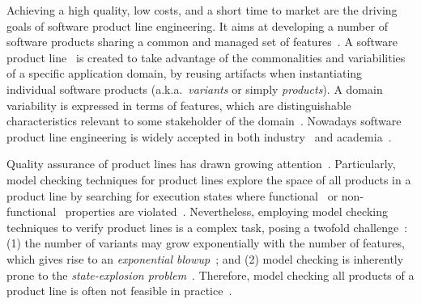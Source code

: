 
Achieving a high quality, low costs, and a short time to market are the driving
goals of software product line engineering.  It aims at developing a number of
software products sharing a common and managed set of
features~\cite{pohl_software_2010}.  A software product
line~\cite{clements_software_2002} is created to take advantage of the
commonalities and variabilities of a specific application domain, by reusing
artifacts when instantiating individual software products (a.k.a.\
\textit{variants} or simply \textit{products}). A domain variability is
expressed in terms of features, which are distinguishable characteristics
relevant to some stakeholder of the domain~\cite{czarnecki_generative_2000}.
Nowadays software product line engineering is widely accepted in both
industry~\cite{spl-hall-of-fame, linden_software_2007} and
academia~\cite{apel_feature-oriented_2013, clements_software_2002,
heradio_bibliometric_2016, pohl_software_2010}.

Quality assurance of product lines has drawn growing
attention~\cite{machado_strategies_2014,thum_classification_2014}.
Particularly, model checking techniques for product lines explore the space of
all products in a product line by searching for execution states where
functional~\cite{ classen_formal_2014, classen_featured_2013,
classen_symbolic_2011} or non-functional~\cite{dubslaff_probabilistic_2015,
	ghezzi_model-based_2013,kowal_scaling_2015,
nunes_variability_2012,rodrigues_modeling_2015} properties are
violated~\cite{clarke_model_1999}.  Nevertheless, employing model checking
techniques to verify product lines is a complex task, posing a twofold
challenge~\cite{classen_featured_2013}: (1) the number of variants may grow
exponentially with the number of features, which gives rise to an
\textit{exponential blowup}~\cite{classen_model_2010, classen_symbolic_2011,
bodden_spllift:_2013, apel_feature-oriented_2013}; and (2) model checking is
inherently prone to the \textit{state-explosion
problem}~\cite{baier_principles_2008,clarke_model_1999}.  Therefore, model
checking all products of a product line is often not feasible in
practice~\cite{thum_classification_2014}.

